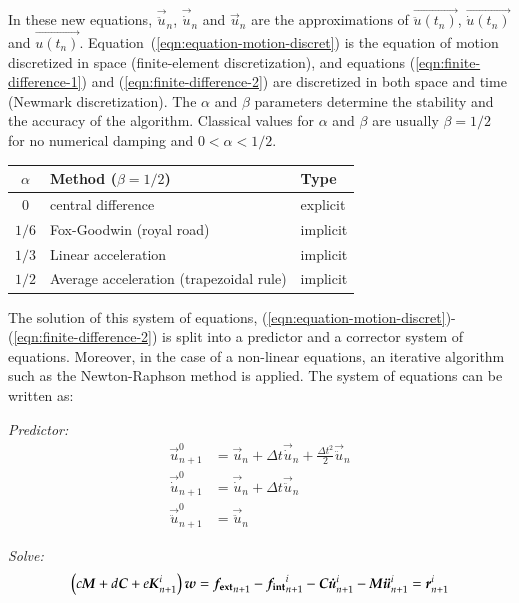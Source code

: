 In these new equations, $\vec{\ddot{u}}_{n}$, $\vec{\dot{u}}_{n}$ and
$\vec{u}_{n}$ are the approximations of $\vec{\ddot{u}(t_n)}$,
$\vec{\dot{u}(t_n)}$ and $\vec{u(t_n)}$.
Equation~(\ref{eqn:equation-motion-discret}) is the equation of motion
discretized in space (finite-element discretization), and equations
(\ref{eqn:finite-difference-1}) and (\ref{eqn:finite-difference-2})
are discretized in both space and time (Newmark discretization).  The
$\alpha$ and $\beta$ parameters determine the stability and the
accuracy of the algorithm. Classical values for $\alpha$ and $\beta$
are usually $\beta = 1/2$ for no numerical damping and $0 < \alpha <
1/2$.

\begin{center}
  \begin{tabular}{cll}
    \toprule
    $\alpha$ & Method ($\beta = 1/2$) & Type\\
    \midrule
    $0$ & central difference & explicit\\
    $1/6$ & Fox-Goodwin (royal road) &implicit\\
    $1/3$ & Linear acceleration &implicit\\
    $1/2$ & Average acceleration (trapezoidal rule)& implicit\\
    \bottomrule
  \end{tabular}
\end{center}

The solution of this system of equations,
(\ref{eqn:equation-motion-discret})-(\ref{eqn:finite-difference-2}) is
split into a predictor and a corrector system of equations.  Moreover,
in the case of a non-linear equations, an iterative algorithm such as
the Newton-Raphson method is applied. The system of equations can be
written as:


\noindent\textit{Predictor:}
\begin{align}
  \vec{u}_{n+1}^{0} &= \vec{u}_{n} + \Delta t
  \vec{\dot{u}}_{n} + \frac{\Delta t^2}{2} \vec{\ddot{u}}_{n} \\
  \vec{\dot{u}}_{n+1}^{0} &= \vec{\dot{u}}_{n} + \Delta t
  \vec{\ddot{u}}_{n} \\
  \vec{\ddot{u}}_{n+1}^{0} &= \vec{\ddot{u}}_{n}
\end{align}

\noindent\textit{Solve:}
\begin{align}
  \left(c \boldsymbol{M} + d \boldsymbol{C} + e \boldsymbol{K}_{n+1}^i\right)
  \boldsymbol{w} = \boldsymbol{f_{{\mathrm{ext}}}}_{n+1} - \boldsymbol{f_{{\mathrm{int}}}}_{n+1}^i -
  \boldsymbol{C} \boldsymbol{\dot{u}}_{n+1}^i - \boldsymbol{M} \boldsymbol{\ddot{u}}_{n+1}^i = \boldsymbol{r}_{n+1}^i
\end{align}

